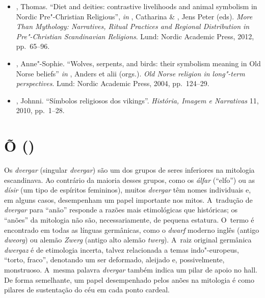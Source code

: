 \begin{itemize}\footnotesize
\item
  , Thomas. ``Diet and deities: contrastive livelihoods and animal
  symbolism in Nordic Pre"-Christian Religious'', \emph{in}  , Catharina
  \& , Jens Peter (eds). \emph{More Than Mythology: Narratives,
  Ritual Practices and Regional Distribution in Pre"-Christian
  Scandinavian Religions}. Lund: Nordic Academic Press, 2012, pp.~65--96.
\item
  , Anne"-Sophie. ``Wolves, serpents, and birds: their symbolism
  meaning in Old Norse beliefs'' \emph{in}  , Anders et alii
  (orgs.). \emph{Old Norse religion in long"-term perspectives}. Lund:
  Nordic Academic Press, 2004, pp.~124--29.
\item
  , Johnni. ``Símbolos religiosos dos vikings''. \emph{História,
  Imagem e Narrativas} 11, 2010, pp.~1--28.
\end{itemize}

\section{Õ ()}

Os \emph{dvergar} (singular \emph{dvergar}) são um dos grupos de seres
inferiores na mitologia escandinava. Ao contrário da maioria desses
grupos, como os \emph{álfar} (``elfo'') ou as \emph{dísir} (um tipo de
espíritos femininos), muitos \emph{dvergar} têm nomes individuais e, em
alguns casos, desempenham um papel importante nos mitos. A~tradução de
\emph{dvergar} para ``anão'' responde a razões mais etimológicas que
históricas; os ``anões'' da mitologia não são, necessariamente, de
pequena estatura. O~termo é encontrado em todas as línguas germânicas,
como o \emph{dwarf} moderno inglês (antigo \emph{dweorg}) ou alemão
\emph{Zwerg} (antigo alto alemão \emph{twerg}). A~raiz original
germânica \emph{dwergaz} é de etimologia incerta, talvez relacionada a
temas indo"-europeus, ``torto, fraco'', denotando um ser deformado,
aleijado e, possivelmente, monstruoso. A~mesma palavra \emph{dvergar}
também indica um pilar de apoio no hall. De forma semelhante, um papel
desempenhado pelos anões na mitologia é como pilares de sustentação do
céu em cada ponto cardeal.


